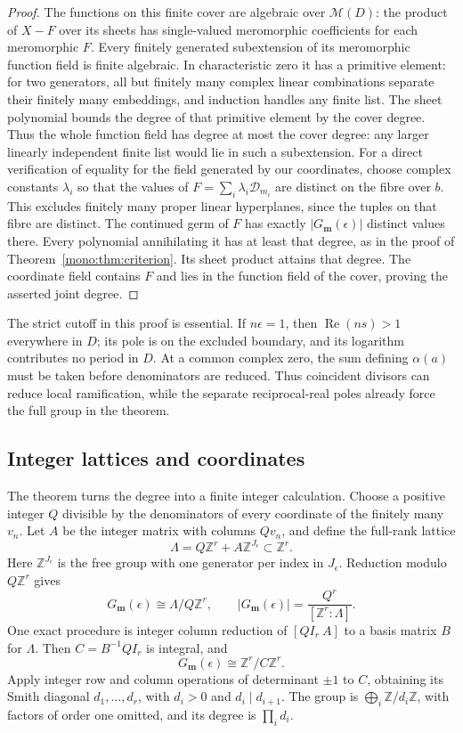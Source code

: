 \begin{proof}
The functions on this finite cover are algebraic over \(\mathcal M(D)\):
the product of \(X-F\) over its sheets has single-valued meromorphic
coefficients for each meromorphic \(F\).  Every finitely generated subextension of its meromorphic function
field is finite algebraic.  In characteristic zero it has a primitive
element: for two generators, all but finitely many complex linear
combinations separate their finitely many embeddings, and induction
handles any finite list.  The sheet polynomial bounds the degree of
that primitive element by the cover degree.  Thus the whole function
field has degree at most the cover degree: any larger linearly
independent finite list would lie in such a subextension.
For a direct verification of equality for the field generated by our
coordinates, choose complex constants \(\lambda_i\) so that the values
of \(F=\sum_i\lambda_i\mathcal D_{m_i}\) are distinct on the fibre
over \(b\).  This excludes finitely many proper linear hyperplanes,
since the tuples on that fibre are distinct.  The continued germ of
\(F\) has exactly \(|G_{\mathbf m}(\epsilon)|\) distinct values there.
Every polynomial annihilating it has at least that degree, as in the
proof of Theorem~\ref{mono:thm:criterion}.  Its sheet product attains
that degree.  The coordinate field contains \(F\) and lies in the
function field of the cover, proving the asserted joint degree.
\end{proof}

The strict cutoff in this proof is essential.  If \(n\epsilon=1\),
then \(\operatorname{Re}(ns)>1\) everywhere in \(D\); its pole is on
the excluded boundary, and its logarithm contributes no period in \(D\).
At a common complex zero, the sum defining \(\alpha(a)\) must be taken
before denominators are reduced.  Thus coincident divisors can reduce
local ramification, while the separate reciprocal-real poles already
force the full group in the theorem.

\subsection{Integer lattices and coordinates}

The theorem turns the degree into a finite integer calculation.
Choose a positive integer \(Q\) divisible by the denominators of every
coordinate of the finitely many \(v_n\).  Let \(A\) be the integer
matrix with columns \(Qv_n\), and define the full-rank lattice
\[
 \Lambda=Q\mathbb Z^r+A\mathbb Z^{J_\epsilon}\subset\mathbb Z^r.
\]
Here \(\mathbb Z^{J_\epsilon}\) is the free group with one generator
per index in \(J_\epsilon\).  Reduction modulo \(Q\mathbb Z^r\)
gives
\[
 G_{\mathbf m}(\epsilon)\cong\Lambda/Q\mathbb Z^r,
 \qquad
 |G_{\mathbf m}(\epsilon)|=\frac{Q^r}{[\mathbb Z^r:\Lambda]}.
\]
One exact procedure is integer column reduction of \([QI_r\ A]\)
to a basis matrix \(B\) for \(\Lambda\).  Then
\(C=B^{-1}QI_r\) is integral, and
\[
 G_{\mathbf m}(\epsilon)\cong\mathbb Z^r/C\mathbb Z^r.
\]
Apply integer row and column operations of determinant \(\pm1\) to
\(C\), obtaining its Smith diagonal
\(d_1,\ldots,d_r\), with \(d_i>0\) and \(d_i\mid d_{i+1}\).
The group is \(\bigoplus_i\mathbb Z/d_i\mathbb Z\), with factors
of order one omitted, and its degree is \(\prod_i d_i\).

